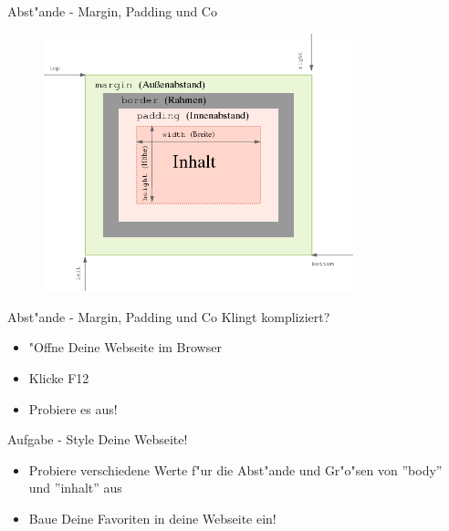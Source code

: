 \documentclass[18pt]{beamer}
\begin{document}
\begin{frame}[fragile]{Abst"ande - Margin, Padding und Co}
\begin{figure}
\includegraphics[width=0.8\textwidth]{600px-Box-Modell} %
\end{figure}
\end{frame}

\begin{frame}[fragile]{Abst"ande - Margin, Padding und Co}
Klingt kompliziert?
\pause
\begin{itemize}
\item "Offne Deine Webseite im Browser
\item Klicke F12
\item Probiere es aus!
\end{itemize}
\end{frame}

\begin{frame}[fragile]{Aufgabe - Style Deine Webseite!}
\begin{itemize}
\item Probiere verschiedene Werte f"ur die Abst"ande und Gr"o"sen von ''body'' und ''inhalt'' aus
\item Baue Deine Favoriten in deine Webseite ein!
\end{itemize}
\end{frame}
\end{document}
